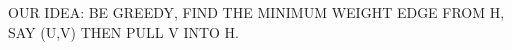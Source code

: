 \documentclass[preview]{standalone}
\begin{document}
\begin{center}
OUR IDEA: BE GREEDY, FIND THE MINIMUM WEIGHT EDGE FROM H\rightarrowY, SAY (U,V) THEN PULL V INTO H.
\end{center}
\end{document}
